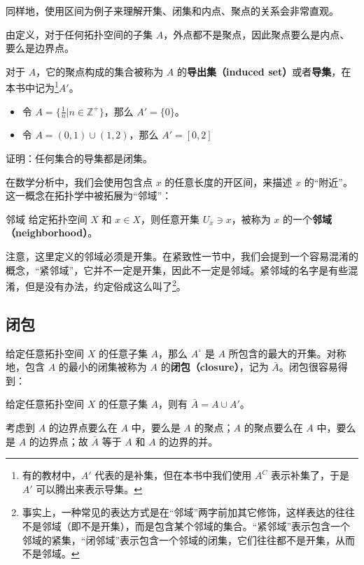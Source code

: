 同样地，使用区间为例子来理解开集、闭集和内点、聚点的关系会非常直观。

由定义，对于任何拓扑空间的子集 $A$，外点都不是聚点，因此聚点要么是内点、要么是边界点。

对于 $A$，它的聚点构成的集合被称为 $A$ 的\textbf{导出集（induced set）}或者\textbf{导集}，在本书中记为\footnote{有的教材中，$A'$ 代表的是补集，但在本书中我们使用 $A^C$ 表示补集了，于是 $A'$ 可以腾出来表示导集。}$A'$。

\begin{example}{}
\begin{itemize}
\item 令 $A=\{\frac{1}{n}|n\in\mathbb{Z}^+\}$，那么 $A'=\{0\}$。
\item 令 $A=(0,1)\cup(1,2)$，那么 $A'=[0,2]$
\end{itemize}
\end{example}

\begin{exercise}{}
证明：任何集合的导集都是闭集。
\end{exercise}

在数学分析中，我们会使用包含点 $x$ 的任意长度的开区间，来描述 $x$ 的“附近”。这一概念在拓扑学中被拓展为“邻域”：

\begin{definition}{邻域}
给定拓扑空间 $X$ 和 $x\in X$，则任意开集 $U_x\ni x$，被称为 $x$ 的一个\textbf{邻域（neighborhood）}。
\end{definition}

注意，这里定义的邻域必须是开集。在紧致性一节中，我们会提到一个容易混淆的概念，“紧邻域”，它并不一定是开集，因此不一定是邻域。紧邻域的名字是有些混淆，但是没有办法，约定俗成这么叫了\footnote{事实上，一种常见的表达方式是在“邻域”两字前加其它修饰，这样表达的往往不是邻域（即不是开集），而是包含某个邻域的集合。“紧邻域”表示包含一个邻域的紧集，“闭邻域”表示包含一个邻域的闭集，它们往往都不是开集，从而不是邻域。}。



\subsection{闭包}

给定任意拓扑空间 $X$ 的任意子集 $A$，那么 $A^\circ$ 是 $A$ 所包含的最大的开集。对称地，包含 $A$ 的最小的闭集被称为 $A$ 的\textbf{闭包（closure）}，记为 $\bar{A}$。闭包很容易得到：

\begin{theorem}{}
给定任意拓扑空间 $X$ 的任意子集 $A$，则有 $\bar{A}=A\cup A'$。
\end{theorem}
\begin{corollary}{}\label{cor_Topo0_1}
考虑到 $A$ 的边界点要么在 $A$ 中，要么是 $A$ 的聚点；$A$ 的聚点要么在 $A$ 中，要么是 $A$ 的边界点；故 $\bar{A}$ 等于 $A$ 和 $A$ 的边界的并。
\end{corollary}

